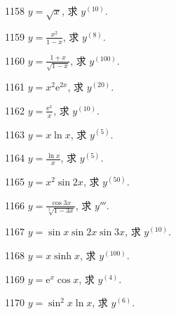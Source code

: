 \begin{prob}[S]{1158}
$y = \sqrt{x}$, 求 $y^{(10)}$.
\end{prob}

\begin{prob}[S]{1159}
$y = \frac{x^2}{1 - x}$, 求 $y^{(8)}$.
\end{prob}

\begin{prob}[S]{1160}
$y = \frac{1 + x}{\sqrt{1 - x}}$, 求 $y^{(100)}$.
\end{prob}

\begin{prob}[S]{1161}
$y = x^2\mathrm{e}^{2x}$, 求 $y^{(20)}$.
\end{prob}

\begin{prob}[S]{1162}
$y = \frac{\mathrm{e}^x}{x}$, 求 $y^{(10)}$.
\end{prob}

\begin{prob}[S]{1163}
$y = x\ln x$, 求 $y^{(5)}$.
\end{prob}

\begin{prob}[S]{1164}
$y = \frac{\ln x}{x}$, 求 $y^{(5)}$.
\end{prob}

\begin{prob}[S]{1165}
$y = x^2\sin 2x$, 求 $y^{(50)}$.
\end{prob}

\begin{prob}[S]{1166}
$y = \frac{\cos 3x}{\sqrt[3]{1 - 3x}}$, 求 $y'''$.
\end{prob}

\begin{prob}[S]{1167}
$y = \sin x\sin 2x\sin 3x$, 求 $y^{(10)}$.
\end{prob}

\begin{prob}[S]{1168}
$y = x\sinh x$, 求 $y^{(100)}$.
\end{prob}

\begin{prob}[S]{1169}
$y = \mathrm{e}^x\cos x$, 求 $y^{(4)}$.
\end{prob}

\begin{prob}[S]{1170}
$y = \sin^2 x\ln x$, 求 $y^{(6)}$.
\end{prob}


